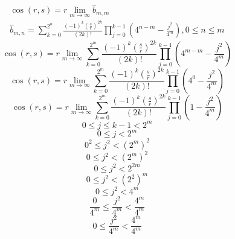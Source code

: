 \documentclass[a4paper,12pt]{report}
\begin{document}
\begin{subequations}
\begin{gather}
\cos(r,s) = r \lim \limits_{m \to \infty} \hat{b}_{m,m} \\
\hat{b}_{m,n} = \sum \limits_{k=0}^{2^n} \frac{(-1)^k \left(\frac{s}{r}\right)^{2k}}{(2k)!} \prod \limits_{j=0}^{k-1} \left(4^{n-m} - \frac{j^2}{4^m}\right), 0 \leq n \leq m
\end{gather}
\end{subequations}
\begin{equation}
\cos(r,s) = r \lim \limits_{m \to \infty} \sum \limits_{k=0}^{2^m} \frac{(-1)^k \left(\frac{s}{r}\right)^{2k}}{(2k)!} \prod \limits_{j=0}^{k-1} \left(4^{m-m} - \frac{j^2}{4^m}\right)
\end{equation}
\begin{equation}
\cos(r,s) = r \lim \limits_{m \to \infty} \sum \limits_{k=0}^{2^m} \frac{(-1)^k \left(\frac{s}{r}\right)^{2k}}{(2k)!} \prod \limits_{j=0}^{k-1} \left(4^{0} - \frac{j^2}{4^m}\right)
\end{equation}
\begin{equation}
\cos(r,s) = r \lim \limits_{m \to \infty} \sum \limits_{k=0}^{2^m} \frac{(-1)^k \left(\frac{s}{r}\right)^{2k}}{(2k)!} \prod \limits_{j=0}^{k-1} \left(1 - \frac{j^2}{4^m}\right)
\end{equation}
\begin{equation}
0 \leq j \leq k - 1 < 2^m
\end{equation}
\begin{equation}
0 \leq j < 2^m
\end{equation}
\begin{equation}
0^2 \leq j^2 < (2^m)^2
\end{equation}
\begin{equation}
0 \leq j^2 < (2^m)^2
\end{equation}
\begin{equation}
0 \leq j^2 < 2^{2m}
\end{equation}
\begin{equation}
0 \leq j^2 < (2^2)^m
\end{equation}
\begin{equation}
0 \leq j^2 < 4^m
\end{equation}
\begin{equation}
\frac{0}{4^m} \leq \frac{j^2}{4^m} < \frac{4^m}{4^m}
\end{equation}
\begin{equation}
0 \leq \frac{j^2}{4^m} < \frac{4^m}{4^m}
\end{equation}
\end{document}
